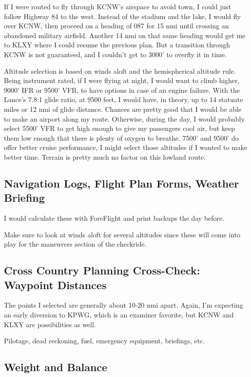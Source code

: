 If I were routed to fly through KCNW's airspace to avoid town, I could just follow Highway 84 to the west. Instead of the stadium and the lake, I would fly over KCNW, then proceed on a heading of 087 for 15 nmi until crossing an abandoned military airfield. Another 14 nmi on that same heading would get me to KLXY where I could resume the previous plan. But a transition through KCNW is not guaranteed, and I couldn't get to 3000' to overfly it in time.

Altitude selection is based on winds aloft and the hemispherical altitude rule. Being instrument rated, if I were flying at night, I would want to climb higher, 9000' IFR or 9500' VFR, to have options in case of an engine failure. With the Lance's 7.8:1 glide ratio, at 9500 feet, I would have, in theory, up to 14 statuate miles or 12 nmi of glide distance. Chances are pretty good that I would be able to make an airport along my route. Otherwise, during the day, I would probably select 5500' VFR to get high enough to give my passengers cool air, but keep them low enough that there is plenty of oxygen to breathe. 7500' and 9500' do offer better cruise performance, I might select those altitudes if I wanted to make better time. Terrain is pretty much no factor on this lowland route.

\subsection{Navigation Logs, Flight Plan Forms, Weather Briefing}

I would calculate these with ForeFlight and print backups the day before.

Make sure to look at winds aloft for several altitudes since these will come into play for the maneuvers section of the checkride.

\subsection{Cross Country Planning Cross-Check: Waypoint Distances}

The points I selected are generally about 10-20 nmi apart. Again, I'm expecting an early diversion to KPWG, which is an examiner favorite, but KCNW and KLXY are possibilities as well.

Pilotage, dead reckoning, fuel, emergency equipment, briefings, etc.

\subsection{Weight and Balance}

